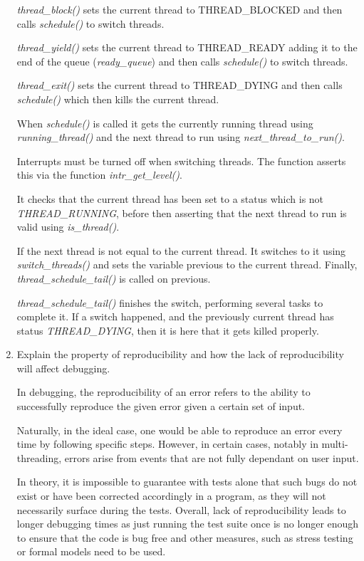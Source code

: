 \documentclass[11pt]{article}
\begin{document}
\begin{enumerate}
\emph{thread\_block()} sets the current thread to THREAD\_BLOCKED and then calls
\emph{schedule()} to switch threads.

\emph{thread\_yield()} sets the current thread to THREAD\_READY adding it to the
end of the queue (\emph{ready\_queue}) and then calls \emph{schedule()} to switch
threads.

\emph{thread\_exit()} sets the current thread to THREAD\_DYING and then calls
\emph{schedule()} which then kills the current thread.

When \emph{schedule()} is called it gets the currently running thread using
\emph{running\_thread()} and the next thread to run using
\emph{next\_thread\_to\_run()}.

Interrupts must be turned off when switching threads. The function asserts this
via the function \emph{intr\_get\_level()}.

It checks that the current thread has been set to a status which is not
\emph{THREAD\_RUNNING}, before then asserting that the next thread to run is
valid using \emph{is\_thread()}.

If the next thread is not equal to the current thread. It switches to it using
\emph{switch\_threads()} and sets the variable previous to the current
thread. Finally, \emph{thread\_schedule\_tail()} is called on previous.

\emph{thread\_schedule\_tail()} finishes the switch, performing several tasks to
complete it. If a switch happened, and the previously current thread has status
\emph{THREAD\_DYING}, then it is here that it gets killed properly.

\item Explain the property of reproducibility and how the lack of
reproducibility will affect debugging.

In debugging, the reproducibility of an error refers to the ability to
successfully reproduce the given error given a certain set of input.

Naturally, in the ideal case, one would be able to reproduce an error every time
by following specific steps. However, in certain cases, notably in
multi-threading, errors arise from events that are not fully dependant on user
input.

In theory, it is impossible to guarantee with tests alone that such bugs do not
exist or have been corrected accordingly in a program, as they will not
necessarily surface during the tests. Overall, lack of reproducibility leads to
longer debugging times as just running the test suite once is no longer enough
to ensure that the code is bug free and other measures, such as stress testing
or formal models need to be used.


\end{enumerate}
\end{document}
